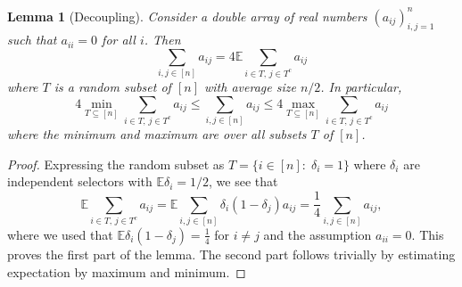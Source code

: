 \documentclass[10pt, openany]{book}
\newtheorem{lemma}[theorem]{Lemma}
\theoremstyle{remark}
\def \E {\mathbb{E}}
\def \d {\delta}
\begin{document}
\begin{lemma}[Decoupling]							\label{decoupling}
  Consider a double array of real numbers $(a_{ij})_{i,j=1}^n$
  such that $a_{ii} = 0$ for all $i$. Then
  $$
  \sum_{i,j \in [n]} a_{ij} = 4 \E \sum_{i \in T,\, j \in T^c} a_{ij}
  $$
  where $T$ is a random subset of $[n]$ with average size $n/2$.
  In particular,
  $$
  4 \min_{T \subseteq [n]} \sum_{i \in T,\, j \in T^c} a_{ij}
  \le  \sum_{i,j \in [n]} a_{ij}
  \le 4 \max_{T \subseteq [n]} \sum_{i \in T,\, j \in T^c} a_{ij}
  $$
  where the minimum and maximum are over all subsets $T$ of $[n]$.
\end{lemma}

\begin{proof}
Expressing the random subset as $T = \{ i \in [n]:\; \d_i=1 \}$
where $\d_i$ are independent selectors with $\E\d_i=1/2$, we see that
$$
\E \sum_{i \in T,\, j \in T^c} a_{ij}
= \E \sum_{i,j \in [n]} \d_i (1-\d_j) a_{ij}
= \frac{1}{4} \sum_{i,j \in [n]} a_{ij},
$$
where we used that $\E \d_i (1-\d_j) = \frac{1}{4}$ for $i \ne j$ and the assumption $a_{ii}=0$.
This proves the first part of the lemma. The second part follows trivially by estimating 
expectation by maximum and minimum.
\end{proof}
\end{document}
